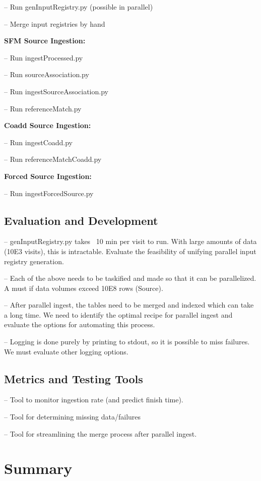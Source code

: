 \documentclass[prd, nofootinbib, floatfix, 11pt,tightenlines,times]{article}
\begin{document}
-- Run genInputRegistry.py (possible in parallel)

-- Merge input registries by hand

{\bf SFM Source Ingestion:}

-- Run ingestProcessed.py

-- Run sourceAssociation.py

-- Run ingestSourceAssociation.py

-- Run referenceMatch.py

{\bf Coadd Source Ingestion:}

-- Run ingestCoadd.py

-- Run referenceMatchCoadd.py

{\bf Forced Source Ingestion:}

-- Run ingestForcedSource.py

\subsection{Evaluation and Development}
-- genInputRegistry.py takes ~10 min per visit to run.  With large
amounts of data (10E3 visits), this is intractable.  Evaluate the
feasibility of unifying parallel input registry generation.

-- Each of the above needs to be taskified and made so that it can be
parallelized.  A must if data volumes exceed 10E8 rows (Source).

-- After parallel ingest, the tables need to be merged and indexed
which can take a long time.  We need to identify the optimal recipe
for parallel ingest and evaluate the options for automating this
process.

-- Logging is done purely by printing to stdout, so it is possible to
miss failures.  We must evaluate other logging options.

\subsection{Metrics and Testing Tools}

-- Tool to monitor ingestion rate (and predict finish time).

-- Tool for determining missing data/failures

-- Tool for streamlining the merge process after parallel ingest.


\section{Summary} 
\end{document}
